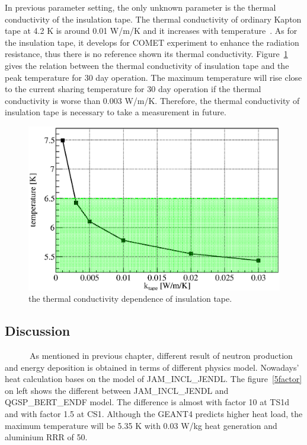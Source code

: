 In previous parameter setting, the only unknown parameter is the thermal conductivity of the insulation tape.
The thermal conductivity of ordinary Kapton tape at 4.2 K is around 0.01 W/m/K and it increases with temperature~\cite{rss90}.
As for the insulation tape, it develops for COMET experiment to enhance the radiation resistance, thus there is no reference shown its thermal conductivity.
Figure~\ref{4tape} gives the relation between the thermal conductivity of insulation tape and the peak temperature for 30 day operation.
The maximum temperature will rise close to the current sharing temperature for 30 day operation if the thermal conductivity is worse than 0.003 W/m/K.
Therefore, the thermal conductivity of insulation tape is necessary to take a measurement in future.
 \begin{figure}[H]
  \centering
  \includegraphics[scale=0.45]{chapter6/fig/tape.eps}
  \caption{ the thermal conductivity dependence of insulation tape.}
  \label{4tape}
 \end{figure}

\subsection{Discussion}
~~~~~~As mentioned in previous chapter, different result of neutron production and energy deposition is obtained in terms of different physics model.
Nowadays' heat calculation bases on the model of JAM\_INCL\_JENDL.
The figure~\ref{5factor} on left shows the different between JAM\_INCL\_JENDL and QGSP\_BERT\_ENDF model.
The difference is almost with factor 10 at TS1d and with factor 1.5 at CS1.
Although the GEANT4 predicts higher heat load, the maximum temperature will be 5.35 K with 0.03 W/kg heat generation and aluminium RRR of 50.

